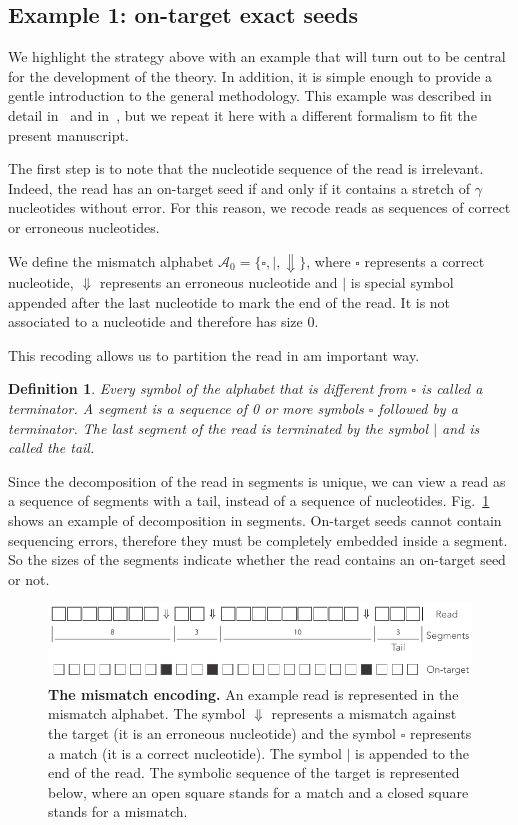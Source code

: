 \documentclass{article}
\newtheorem{definition}{Definition}
\begin{document}
\subsection{Example 1: on-target exact seeds}
\label{sec:example_exact}

We highlight the strategy above with an example that will turn out to be
central for the development of the theory. In addition, it is simple
enough to provide a gentle introduction to the general methodology. This
example was described in detail in~\cite{filion2017analytic} and
in~\cite{filion2018analytic}, but we repeat it here with a different
formalism to fit the present manuscript.

The first step is to note that the nucleotide sequence of the read is
irrelevant. Indeed, the read has an on-target seed if and only if it
contains a stretch of $\gamma$ nucleotides without error. For this reason,
we recode reads as sequences of correct or erroneous nucleotides.

We define the mismatch alphabet $\mathcal{A}_0 = \{\square, |,
\Downarrow\}$, where $\square$ represents a correct nucleotide,
$\Downarrow$ represents an erroneous nucleotide and $|$ is special symbol
appended after the last nucleotide to mark the end of the read. It is not
associated to a nucleotide and therefore has size 0.

This recoding allows us to partition the read in am important way.

\begin{definition}
\label{def:seg}
Every symbol of the alphabet that is different from $\square$ is called a
terminator. A segment is a sequence of 0 or more symbols $\square$
followed by a terminator. The last segment of the read is terminated by
the symbol $|$ and is called the tail.
\end{definition}

Since the decomposition of the read in segments is unique, we can view a
read as a sequence of segments with a tail, instead of a sequence of
nucleotides. Fig.~\ref{fig:simple} shows an example of decomposition in
segments. On-target seeds cannot contain sequencing errors, therefore they
must be completely embedded inside a segment. So the sizes of the segments
indicate whether the read contains an on-target seed or not.

\begin{figure}[h]
\centering
\includegraphics[scale=0.85]{sketch_simple.pdf}
\caption{\textbf{The mismatch encoding.}
An example read is represented in the mismatch alphabet. The symbol
$\Downarrow$ represents a mismatch against the target (it is an erroneous
nucleotide) and the symbol $\square$ represents a match (it is a correct
nucleotide). The symbol $|$ is appended to the end of the read. The
symbolic sequence of the target is represented below, where an open square
stands for a match and a closed square stands for a mismatch.}
\label{fig:simple}
\end{figure}
\end{document}
